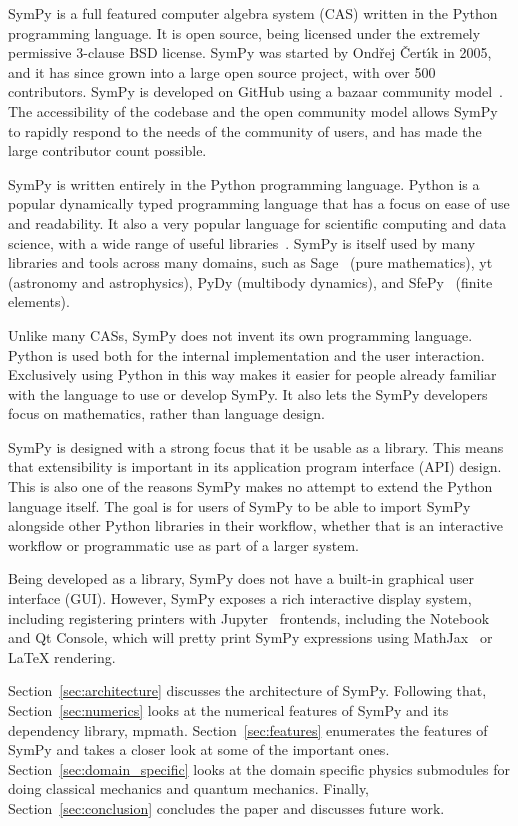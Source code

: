 SymPy is a full featured computer algebra system (CAS) written in the Python
programming language. It is open source, being licensed under the extremely
permissive 3-clause BSD license.
SymPy was started by Ond\v{r}ej \v{C}ert\'{\i}k in 2005, and it has since
grown into a large open source project, with over 500 contributors. SymPy is
developed on GitHub using a bazaar community
model~\cite{raymond1999cathedral}. The accessibility of the codebase and the
open community model allows SymPy to rapidly respond to the needs of the
community of users, and has made the large contributor count possible.

SymPy is written entirely in the Python programming language.
Python is a popular dynamically typed programming language that has a focus on
ease of use and readability. It also a very popular language for scientific
computing and data science, with a wide range of useful
libraries~\cite{oliphant2007python}. SymPy is itself used by many libraries
and tools across many domains, such as Sage~\cite{SAGE} (pure mathematics),
yt~\cite{2011ApJS..192....9T} (astronomy and astrophysics), PyDy
(multibody
dynamics), and SfePy~\cite{cimrman2014sfepy} (finite elements).

Unlike many CASs, SymPy does not invent its own programming language. Python
is used both for the internal implementation and the user interaction.
Exclusively using Python in this way makes it easier for people already
familiar with the language to use or develop SymPy. It also lets the SymPy
developers focus on mathematics, rather than language design.

SymPy is designed with a strong focus that it be usable as a library. This
means that extensibility is important in its application program interface
(API) design. This is also one of the reasons SymPy makes no attempt to extend
the Python language itself. The goal is for users of SymPy to be able to
import SymPy alongside other Python libraries in their workflow, whether that
is an interactive workflow or programmatic use as part of a larger system.

Being developed as a library, SymPy does not have a built-in graphical user
interface (GUI). However, SymPy exposes a rich interactive display system,
including registering printers with Jupyter~\cite{perez2007ipython} frontends,
including the Notebook and Qt Console, which will pretty print SymPy
expressions using MathJax~\cite{cervone2012mathjax} or \LaTeX{} rendering.

Section~\ref{sec:architecture} discusses the architecture of SymPy. Following
that, Section~\ref{sec:numerics} looks at the numerical features of SymPy and
its dependency library, mpmath. Section~\ref{sec:features} enumerates the
features of SymPy and takes a closer look at some of the important ones.
Section~\ref{sec:domain_specific} looks at the domain specific physics
submodules for doing classical mechanics and quantum mechanics. Finally,
Section~\ref{sec:conclusion} concludes the paper and discusses future work.
